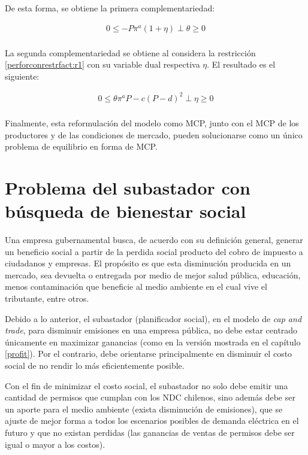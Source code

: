De esta forma, se obtiene la primera complementariedad:

\begin{equation}
\begin{array}{rrclcl}
    0\leq -P\pi^a(1+\eta) \perp \theta \geq 0 \label{compllag3}\\
\end{array}
\end{equation}

La segunda complementariedad se obtiene al considera la restricción \ref{perforconrestrfact:r1} con su variable dual respectiva $\eta$. El resultado es el siguiente:

\begin{equation}
\begin{array}{rrclcl}
    0 \leq \theta \pi^a P - c(P-d)^2 \perp \eta \geq 0 \label{compllag31}\\
\end{array}
\end{equation}

Finalmente, esta reformulación del modelo como MCP, junto con el MCP de los productores y de las condiciones de mercado, pueden solucionarse como un único problema de equilibrio en forma de MCP.


\section{Problema del subastador con búsqueda de bienestar social}\label{bienestarsocial}

Una empresa gubernamental busca, de acuerdo con su definición general, generar un beneficio social a partir de la perdida social producto del cobro de impuesto a ciudadanos y empresas. El propósito es que esta disminución producida en un mercado, sea devuelta o entregada por medio de mejor salud pública, educación, menos contaminación que beneficie al medio ambiente en el cual vive el tributante, entre otros. 
\vspace{2.5mm}

Debido a lo anterior, el subastador (planificador social), en el modelo de \textit{cap and trade}, para disminuir emisiones en una empresa pública, no debe estar centrado únicamente en maximizar ganancias (como en la versión mostrada en el capítulo \ref{profit}). Por el contrario, debe orientarse principalmente en disminuir el costo social de no rendir lo más eficientemente posible.
\vspace{2.5mm}

Con el fin de minimizar el costo social, el subastador no solo debe emitir una cantidad de permisos que cumplan con los NDC chilenos, sino además debe ser un aporte para el medio ambiente (exista disminución de emisiones), que se ajuste de mejor forma a todos los escenarios posibles de demanda eléctrica en el futuro y que no existan perdidas (las ganancias de ventas de permisos debe ser igual o mayor a los costos). 
\vspace{2.5mm}

